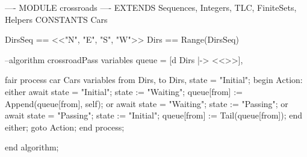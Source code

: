 \documentclass[14pt, openany]{book}
\begin{document}
\begin{tla}
---- MODULE crossroads ----
EXTENDS Sequences, Integers, TLC, FiniteSets, Helpers
CONSTANTS Cars

DirsSeq == <<"N", "E", "S", "W">>
Dirs == Range(DirsSeq)
\end{tla}
\begin{tlatex}
\@x{}\moduleLeftDash{}\moduleRightDash\@xx{}%
%
%
\@pvspace{8.0pt}%
%
\end{tlatex}
\begin{ppcal}
--algorithm crossroadPass
variables
  queue = [d \in Dirs |-> <<>>],

fair process car \in Cars
variables
  from \in Dirs, to \in Dirs, state = "Initial";
begin
  Action:
    either
      await state = "Initial";
      state := "Waiting";
      queue[from] := Append(queue[from], self);
    or
      await state = "Waiting";
      state := "Passing";
    or
      await state = "Passing";
      state := "Initial";
      queue[from] := Tail(queue[from]);
    end either;
    goto Action;
end process;

end algorithm;
\end{ppcal}
\begin{tlatex}
%
\@x{ {\p@variables}}%
\@pvspace{8.0pt}%
%
\@x{ {\p@variables}}%
\@x{ {\p@begin}}%
%
%
%
%
%
%
%
%
%
%
%
%
%
\@x{ {\p@end} {\p@process} {\p@semicolon}}%
\@pvspace{8.0pt}%
\@x{ {\p@end} {\p@algorithm} {\p@semicolon}}%
\end{tlatex}
\end{document}
